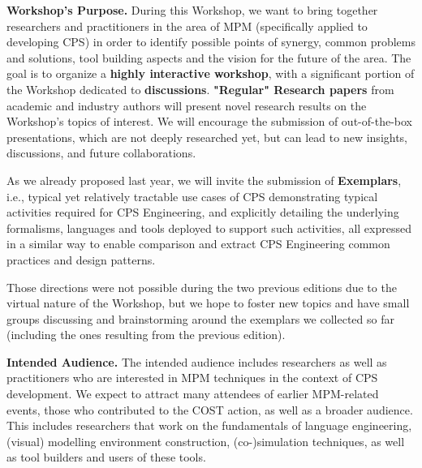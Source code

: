 \smallskip\noindent
\textbf{Workshop's Purpose.} During this Workshop, we want to bring together 
researchers and practitioners in the area of MPM (specifically applied to 
developing CPS) in order to identify possible points of synergy, common problems
and solutions, tool building aspects and the vision for the future of the area.
The goal is to organize a \textbf{highly interactive workshop}, with a significant 
portion of the Workshop dedicated to \textbf{discussions}.
\textbf{"Regular" Research papers} from academic and industry authors 
   will present novel research results on the Workshop's topics of interest. 
   We will encourage the submission of out-of-the-box presentations, which are 
   not deeply researched yet, but can lead to new insights, discussions, and 
   future collaborations.

As we already proposed last year, we will invite the submission of 
   \textbf{Exemplars}, i.e., typical yet relatively tractable use cases of CPS 
   demonstrating typical activities required for CPS Engineering, and explicitly
   detailing the underlying formalisms, languages and tools deployed to support 
   such activities, all expressed in a similar way to enable comparison and 
   extract CPS Engineering common practices and design patterns.

Those directions were not possible during the two previous editions due to the
virtual nature of the Workshop, but we hope to foster new topics and have small
groups discussing and brainstorming around the exemplars we collected so far 
(including the ones resulting from the previous edition).



\smallskip
\noindent
\textbf{Intended Audience.}
%
The intended audience includes researchers as well as practitioners who are 
interested in MPM techniques in the context of CPS development.
We expect to attract many attendees of earlier MPM-related events, those who 
contributed to the COST action, as well as a broader audience.
This includes researchers that work on the fundamentals of language 
engineering, (visual) modelling environment construction, (co-)simulation 
techniques, as well as tool builders and users of these tools.



